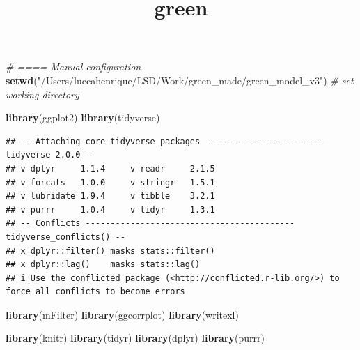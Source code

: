 \documentclass[
]{article}
\title{green}
\author{}
\date{\vspace{-2.5em}}
\newenvironment{Shaded}{\begin{snugshade}}{\end{snugshade}}
\newcommand{\CommentTok}[1]{\textcolor[rgb]{0.56,0.35,0.01}{\textit{#1}}}
\newcommand{\FunctionTok}[1]{\textcolor[rgb]{0.13,0.29,0.53}{\textbf{#1}}}
\newcommand{\NormalTok}[1]{#1}
\newcommand{\StringTok}[1]{\textcolor[rgb]{0.31,0.60,0.02}{#1}}
\begin{document}
\maketitle

\begin{Shaded}
\begin{Highlighting}[]
\CommentTok{\# ==== Manual configuration}
\FunctionTok{setwd}\NormalTok{(}\StringTok{"/Users/luccahenrique/LSD/Work/green\_made/green\_model\_v3"}\NormalTok{) }\CommentTok{\# set working directory}


\FunctionTok{library}\NormalTok{(ggplot2)}
\FunctionTok{library}\NormalTok{(tidyverse)}
\end{Highlighting}
\end{Shaded}

\begin{verbatim}
## -- Attaching core tidyverse packages ------------------------ tidyverse 2.0.0 --
## v dplyr     1.1.4     v readr     2.1.5
## v forcats   1.0.0     v stringr   1.5.1
## v lubridate 1.9.4     v tibble    3.2.1
## v purrr     1.0.4     v tidyr     1.3.1
## -- Conflicts ------------------------------------------ tidyverse_conflicts() --
## x dplyr::filter() masks stats::filter()
## x dplyr::lag()    masks stats::lag()
## i Use the conflicted package (<http://conflicted.r-lib.org/>) to force all conflicts to become errors
\end{verbatim}

\begin{Shaded}
\begin{Highlighting}[]
\FunctionTok{library}\NormalTok{(mFilter)}
\FunctionTok{library}\NormalTok{(ggcorrplot)}
\FunctionTok{library}\NormalTok{(writexl)}

\FunctionTok{library}\NormalTok{(knitr)}
\FunctionTok{library}\NormalTok{(tidyr)}
\FunctionTok{library}\NormalTok{(dplyr)}
\FunctionTok{library}\NormalTok{(purrr)}
\end{Highlighting}
\end{Shaded}
\end{document}
